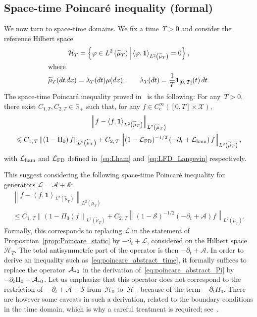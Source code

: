 \documentclass[AHL,Unicode,longabstracts,MathTools,published]{cedram}
\newcommand{\rmc}{\mathrm{c}}
\newcommand{\cL}{\mathcal{L}}
\newcommand{\cLs}{\mathcal{S}}
\newcommand{\cLa}{\mathcal{A}}
\newcommand{\cX}{\mathcal{X}}
\newcommand{\cH}{\mathcal{H}}
\newcommand{\R}{\mathbb{R}}
\newcommand{\bfun}{\mathbf{1}}
\newcommand{\cLham}{\mathcal{L}_{\rm ham}}
\newcommand{\cLFD}{\mathcal{L}_{\rm FD}}
\newcommand{\subplus}{\textnormal{\texttt{+}}}
\renewcommand{\leq}{\leqslant}
\begin{document}
\subsection{Space-time Poincaré inequality (formal)} We now turn to space-time domains. We fix a time~$T>0$ and consider the reference Hilbert space
\begin{gather*}
\cH_T = \left\{ \varphi \in L^2\left(\widetilde{\mu}_T\right) \, \middle| \, \left\langle \varphi,\bfun\right\rangle_{L^2\left(\widetilde{\mu}_T\right)} = 0 \right\},
\\
\intertext{where}
\widetilde{\mu}_T(dt \, dx) = \lambda_T(dt) \mu(dx), \qquad \lambda_T(dt) = \frac1T \bfun_{\left[0,\,T\right]}(t) \, dt.
\end{gather*}
The space-time Poincaré inequality proved in~\cite{AM19,CLW19} is the following: For any~$T>0$, there exist $C_{1,T},C_{2,T}\in \R_+$ such that, for any $f \in C_\rmc^\infty([0,T] \times \cX)$,
\begin{multline*}
\left\| f-\left\langle f,\bfun\right\rangle_{L^2\left(\widetilde{\mu}_T\right)}\right\|_{L^2\left(\widetilde{\mu}_T\right)} \\
\leq C_{1,\,T} \left\| \left(1-\Pi_0\right)f \right\|_{L^2\left(\widetilde{\mu}_T\right)} + C_{2,\,T} \left\| (1-\cLFD)^{-1/2}\left(-\partial_t + \cLham\right) f \right\|_{L^2\left(\widetilde{\mu}_T\right)},
\end{multline*}
with $\cLham$ and $\cLFD$ defined in~\eqref{eq:Lham} and~\eqref{eq:LFD_Langevin} respectively.

This suggest considering the following space-time Poincaré inequality for generators $\cL = \cLa + \cLs$:
\begin{multline}\label{eq:poincare_abstract_time}
\left\| f-\left\langle f,\bfun\right\rangle_{L^2\left(\widetilde{\mu}_T\right)}\right\|_{L^2\left(\widetilde{\mu}_T\right)} \\
\leq C_{1,\,T} \left\| (1-\Pi_0)f \right\|_{L^2\left(\widetilde{\mu}_T\right)} + C_{2,\,T} \left\| (1-\cLs)^{-1/2}\left(-\partial_t + \cLa\right) f \right\|_{L^2\left(\widetilde{\mu}_T\right)}.
\end{multline}
Formally, this corresponds to replacing $\cL$ in the statement of Proposition~\ref{prop:Poincare_static} by $-\partial_t + \cL$, considered on the Hilbert space~$\cH_T$. The total antisymmetric part of the operator is then $-\partial_t + \cLa$. In order to derive an inequality such as~\eqref{eq:poincare_abstract_time}, it formally suffices to replace the operator~$\cLa_{\subplus 0}$ in the derivation of~\eqref{eq:poincare_abstract_Pi} by $-\partial_t \Pi_0 + \cLa_{\subplus 0}$. Let us emphasize that this operator does not correspond to the restriction of~$-\partial_t + \cLa + \cLs$ from~$\cH_0$ to~$\cH_+$ because of the term~$-\partial_t \Pi_0$. There are however some caveats in such a derivation, related to the boundary conditions in the time domain, which is why a careful treatment is required; see~\cite[Lemma~2.6]{CLW19}.
\end{document}

